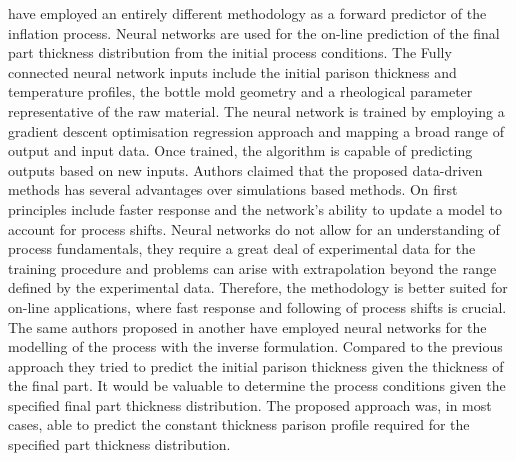 \citep{diraddo1993line} have employed an entirely different methodology as a forward predictor of the inflation process. Neural networks are used for the on-line prediction of the final part thickness distribution from the initial process conditions. The Fully connected neural network inputs include the initial parison thickness and temperature profiles, the bottle mold geometry and a rheological parameter representative of the raw material. The neural network is trained by employing a gradient descent optimisation regression approach and mapping a broad range of output and input data. Once trained, the algorithm is capable of predicting outputs based on new inputs. Authors claimed that the proposed data-driven methods has several advantages over simulations based methods. On first principles include faster response and the network’s ability to update a model to account for process shifts. Neural networks do not allow for an understanding of process fundamentals, they require a great deal of experimental data for the training procedure and problems can arise with extrapolation beyond the range defined by the experimental data. Therefore, the methodology is better suited for on-line applications, where fast response and following of process shifts is crucial. The same authors proposed in \citep{diraddo1993modeling} another have employed neural networks for the modelling of the process with the inverse formulation. Compared to the previous approach they tried to predict the initial parison thickness given the thickness of the final part. It would be valuable to determine the process conditions given the specified final part thickness distribution. The proposed approach was, in most cases, able to predict the constant thickness parison profile required for the specified part thickness distribution.   

